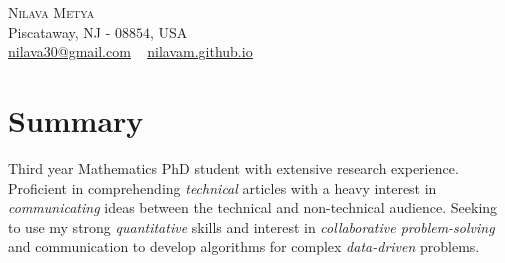 
\usepackage{tabto}
\usepackage{setspace}
\usepackage{etaremune}
\usepackage{xcolor}
\newcommand*\circled[1]{\tikz[baseline=(char.base)]{
            \node[shape=circle,draw,inner sep=1pt, line width=1.1pt] (char) {#1};}}






\begin{center}\vspace{-55pt}
    {\huge \scshape Nilava Metya} \\
    Piscataway, NJ - $08854$, USA\\
{\small 
\href{mailto:nilava30@gmail.com}{\circled{\scriptsize\faEnvelope}  \underline{nilava30@gmail.com}} ~ 
{\circled{\scriptsize\faHome} \underline{\url{nilavam.github.io}}}}
\end{center}

\vspace{\gap}
\section{Summary}

Third year Mathematics PhD student with extensive research experience. Proficient in comprehending \textit{technical} articles with a heavy interest in \textit{communicating} ideas between the technical and non-technical audience. Seeking to use my strong \textit{quantitative} skills and interest in \textit{collaborative problem-solving} and communication to develop algorithms for complex \textit{data-driven} problems.

